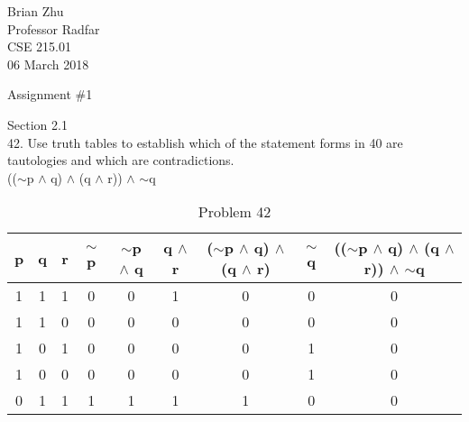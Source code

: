 \documentclass{article}
\begin{document}
\noindent
Brian Zhu \\
Professor Radfar \\
CSE 215.01 \\
06 March 2018 \\
\begin{center}
Assignment \#1
\end{center}

Section 2.1\\
42. Use truth tables to establish which of the statement forms in 40 are tautologies and which are contradictions. \\
(($\sim$p $\wedge$  q) $\wedge$  (q $\wedge$  r)) $\wedge$  $\sim$q

\begin{table}[h]
\centering
\caption{Problem 42}
\label{my-label}
\begin{tabular}{|c|c|c|c|c|c|c|c|c|}
\hline
p & q & r & $\sim$p & $\sim$p $\wedge$  q & q $\wedge$  r & ($\sim$p $\wedge$  q) $\wedge$  (q $\wedge$  r) & $\sim$q & (($\sim$p $\wedge$  q) $\wedge$  (q $\wedge$  r)) $\wedge$  $\sim$q \\ \hline
1 & 1 & 1 & 0       & 0                           & 1                     & 0                                                                       & 0       & 0                                                                                                   \\ \hline
1 & 1 & 0 & 0       & 0                           & 0                     & 0                                                                       & 0       & 0                                                                                                   \\ \hline
1 & 0 & 1 & 0       & 0                           & 0                     & 0                                                                       & 1       & 0                                                                                                   \\ \hline
1 & 0 & 0 & 0       & 0                           & 0                     & 0                                                                       & 1       & 0                                                                                                   \\ \hline
0 & 1 & 1 & 1       & 1                           & 1                     & 1                                                                       & 0       & 0                                                                                                   \\ \hline

\end{tabular}
\end{table}
\end{document}
